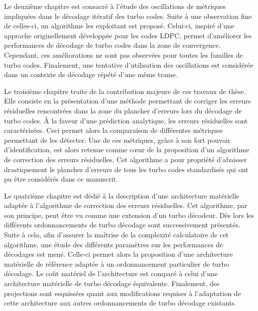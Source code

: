 Le deuxième chapitre est consacré à l'étude des oscillations de métriques impliquées dans le décodage itératif des 
turbo codes. Suite à une observation fine de celles-ci, un algorithme les exploitant est proposé. Celui-ci, inspiré 
d'une approche originellement développée pour les codes LDPC, permet d'améliorer les performances de décodage de turbo codes dans la 
zone de convergence. Cependant, ces améliorations ne sont pas observées pour toutes les familles de turbo codes. 
Finalement, une tentative d'utilisation des oscillations est considérée dans un contexte de décodage répété d'une même 
trame.

Le troisième chapitre traite de la contribution majeure de ces travaux de thèse. Elle consiste en la présentation d'une méthode 
permettant de corriger les erreurs résiduelles rencontrées dans la zone du plancher d'erreurs lors du décodage de turbo 
codes. À la faveur d'une prédiction analytique, les erreurs résiduelles sont caractérisées. Ceci permet alors la 
comparaison de différentes métriques permettant de les détecter. Une de ces métriques, grâce à son fort pouvoir 
d'identification, est alors retenue comme cœur de la proposition d'un algorithme de correction des erreurs résiduelles. 
Cet algorithme a pour propriété d'abaisser drastiquement le plancher d'erreurs de tous les turbo codes standardisés
qui ont pu être considérés dans ce manuscrit. 

Le quatrième chapitre est dédié à la description d'une architecture matérielle adaptée à l'algorithme de correction 
des erreurs résiduelles. Cet algorithme, par son principe, peut être vu comme une extension d'un turbo décodeur. Dès 
lors les différents ordonnancements de turbo décodage sont successivement présentés. Suite à cela, afin d'assurer la maîtrise de la complexité 
calculatoire de cet algorithme, une étude des différents paramètres 
sur les performances de décodages est mené. Celle-ci permet alors la proposition d'une architecture 
matérielle de référence adaptée à un ordonnancement particulier de turbo décodage. Le coût matériel de l'architecture 
est comparé à celui d'une architecture matérielle de turbo décodage équivalente. Finalement, des projections sont 
esquissées quant aux modifications requises à l'adaptation de cette architecture aux autres ordonnancements de turbo 
décodage existants.

